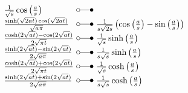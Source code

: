 \[\begin{array}{@{}l@{ ~ \laplace ~ }l@{}}
    \frac{1}{\sqrt{s}} \cos\left(\frac{a}{s}\right) \\
\frac{\sinh(\sqrt{2 at}) \cos(\sqrt{2 at})}{\sqrt{a \pi}} &
    \frac{1}{s \sqrt{2 s}} \left(\cos\left(\frac{a}{s}\right) - \sin\left(\frac{a}{s}\right)\right) \\
\frac{\cosh(2 \sqrt{at}) - \cos(2 \sqrt{at})}{2 \sqrt{\pi t}} &
    \frac{1}{\sqrt{s}} \sinh\left(\frac{a}{s}\right) \\
\frac{\sinh(2 \sqrt{at}) - \sin(2 \sqrt{at})}{2 \sqrt{a \pi}} &
    \frac{1}{s \sqrt{s}} \sinh\left(\frac{a}{s}\right) \\
\frac{\cosh(2 \sqrt{at}) + \cos(2 \sqrt{at})}{2 \sqrt{\pi t}} &
    \frac{1}{\sqrt{s}} \cosh\left(\frac{a}{s}\right) \\
\frac{\sinh(2 \sqrt{at}) + \sin(2 \sqrt{at})}{2 \sqrt{a \pi}} &
    \frac{1}{s \sqrt{s}} \cosh\left(\frac{a}{s}\right) \\
\end{array} \]

